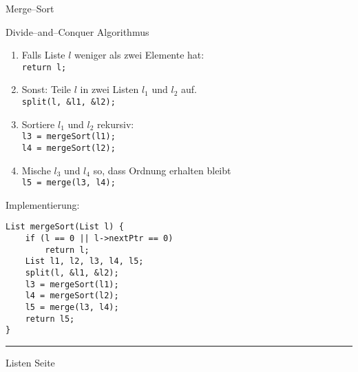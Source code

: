 \begin{slide}{}
\normalsize

\begin{center}
Merge--Sort
\end{center}
\vspace*{0.5cm}

\footnotesize
Divide--and--Conquer Algorithmus
\begin{enumerate}
\item Falls Liste $l$ weniger als zwei Elemente hat: \\[0.3cm]
      \hspace*{1.3cm} \texttt{return l;}
\item Sonst: Teile $l$ in zwei Listen $l_1$ und $l_2$ auf. \\[0.3cm]
      \hspace*{1.3cm} \texttt{split(l, \&l1, \&l2);} 
\item Sortiere $l_1$ und $l_2$ rekursiv: \\[0.3cm]
      \hspace*{1.3cm} \texttt{l3 = mergeSort(l1);} \\
      \hspace*{1.3cm} \texttt{l4 = mergeSort(l2);}
\item Mische $l_3$ und $l_4$ so, dass Ordnung erhalten bleibt \\[0.3cm]
      \hspace*{1.3cm} \texttt{l5 = merge(l3, l4);}
\end{enumerate}
Implementierung:
\begin{verbatim}
List mergeSort(List l) {
    if (l == 0 || l->nextPtr == 0)
        return l;
    List l1, l2, l3, l4, l5;
    split(l, &l1, &l2);
    l3 = mergeSort(l1);
    l4 = mergeSort(l2);
    l5 = merge(l3, l4);
    return l5;
}
\end{verbatim}


\vspace*{\fill}
\tiny \addtocounter{mypage}{1}
\rule{17cm}{1mm}
Listen  \hspace*{\fill} Seite 
\end{slide}


